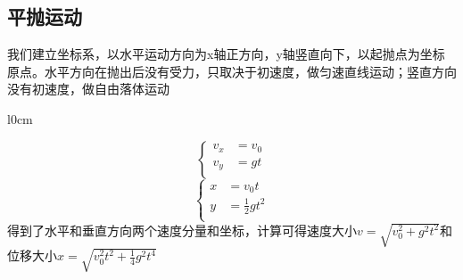 \subsection{平抛运动}
我们建立坐标系，以水平运动方向为x轴正方向，y轴竖直向下，以起抛点为坐标原点。水平方向在抛出后没有受力，只取决于初速度，做匀速直线运动；竖直方向没有初速度，做自由落体运动
\begin{wrapfigure}{l}{0cm}
\end{wrapfigure}
\begin{equation}
	\left\{
		\begin{aligned}
			v_x &= v_0 \\
			v_y &= gt \\
		\end{aligned}
	\right.
	\label{pingpao_speed}
\end{equation}
\begin{equation}
	\left\{
		\begin{aligned}
			x &= v_0 t \\
			y &= \frac{1}{2}gt^2 \\
		\end{aligned}
	\right.
	\label{pingpao_position}
\end{equation}
得到了水平和垂直方向两个速度分量和坐标，计算可得速度大小$v=\sqrt{v_0^2+g^2t^2}$和位移大小$x=\sqrt{v_0^2t^2+\frac{1}{4}g^2t^4}$ \\
